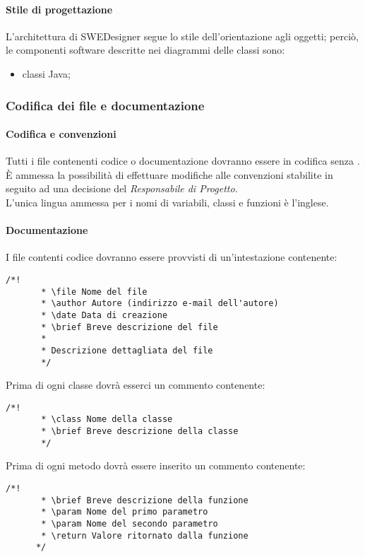 \paragraph{Stile di progettazione} L’architettura di SWEDesigner segue lo
stile dell’orientazione agli oggetti; perciò, le componenti software descritte
nei diagrammi delle classi sono:
\begin{itemize}
\item classi Java;
\end{itemize}

\subsubsection{Codifica dei file e documentazione}
   \paragraph{Codifica e convenzioni}
   Tutti i file contenenti codice o documentazione dovranno essere in codifica  senza .\\
   È ammessa la possibilità di effettuare modifiche alle convenzioni stabilite in seguito ad una decisione del \emph{Responsabile di Progetto}.\\
   L’unica lingua ammessa per i nomi di variabili, classi e funzioni è l’inglese.
   \paragraph{Documentazione}
     I file contenti codice dovranno essere provvisti di un'intestazione contenente:
     \begin{lstlisting}[frame=single]
       /*!
       * \file Nome del file
       * \author Autore (indirizzo e-mail dell'autore)
       * \date Data di creazione
       * \brief Breve descrizione del file
       *
       * Descrizione dettagliata del file
       */
     \end{lstlisting}
     Prima di ogni classe dovrà esserci un commento contenente:
     \begin{lstlisting}[frame=single]
       /*!
       * \class Nome della classe
       * \brief Breve descrizione della classe
       */
     \end{lstlisting}
     Prima di ogni metodo dovrà essere inserito un commento contenente:
     \begin{lstlisting}[frame=single]
       /*!
       * \brief Breve descrizione della funzione
       * \param Nome del primo parametro
       * \param Nome del secondo parametro
       * \return Valore ritornato dalla funzione
      */
  \end{lstlisting}
